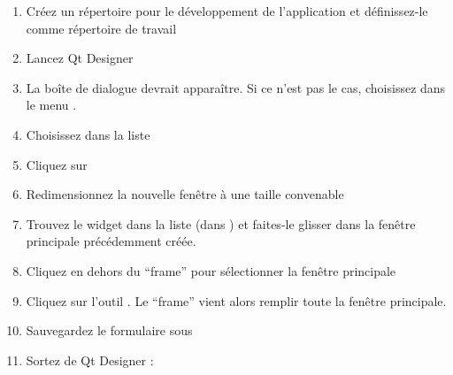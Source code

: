 \begin{enumerate}
\item Cr\'eez un r\'epertoire pour le d\'eveloppement de l'application et d\'efinissez-le comme r\'epertoire de travail
\item Lancez Qt Designer
\item La bo\^ite de dialogue  devrait appara\^itre. Si ce n'est pas le cas, choisissez  dans le menu .
\item Choisissez  dans la liste 
\item Cliquez sur  
\item Redimensionnez la nouvelle fen\^etre \`a une taille convenable
\item Trouvez le widget  dans la liste (dans ) et faites-le glisser dans la fen\^etre principale pr\'ec\'edemment cr\'e\'ee.
\item Cliquez en dehors du ``frame'' pour s\'electionner la fen\^etre principale 
\item Cliquez sur l'outil . Le ``frame'' vient alors remplir toute la fen\^etre principale.
\item Sauvegardez le formulaire sous  
\item Sortez de Qt Designer : 
\end{enumerate} 

